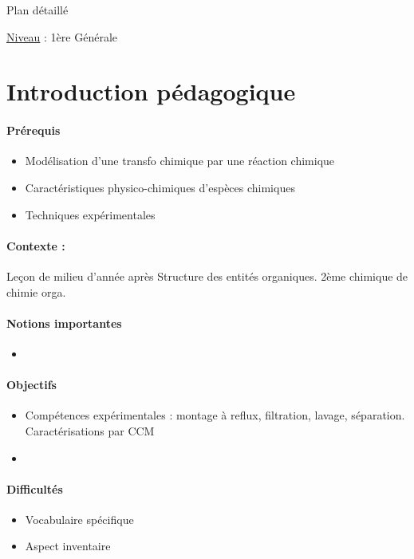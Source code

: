 \begin{reportBlock}{Plan détaillé}

\underline{Niveau} : 1ère Générale \\

\section*{Introduction pédagogique}


\paragraph*{Prérequis}
\begin{itemize}
\item Modélisation d'une transfo chimique par une réaction chimique
\item Caractéristiques physico-chimiques d'espèces chimiques
\item Techniques expérimentales
\end{itemize}
\paragraph*{Contexte :}
Leçon de milieu d'année après Structure des entités organiques. 2ème chimique de chimie orga.

\paragraph*{Notions importantes}

\begin{itemize}
\item 
\end{itemize}

\paragraph*{Objectifs}

\begin{itemize}
\item Compétences expérimentales : montage à reflux, filtration, lavage, séparation. Caractérisations par CCM
\item 
\end{itemize}

\paragraph*{Difficultés}

\begin{itemize}
\item Vocabulaire spécifique
\item Aspect inventaire
\end{itemize}


\end{reportBlock}
